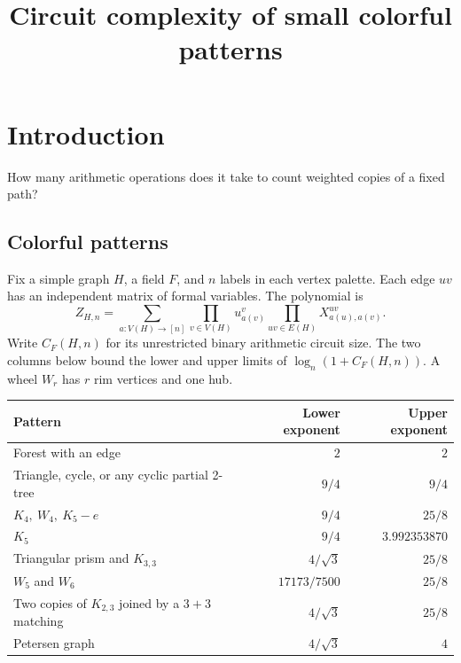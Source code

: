 \documentclass[11pt,letterpaper]{article}
\title{Circuit complexity of small colorful patterns}
\author{}
\begin{document}
\maketitle
\section{Introduction}
How many arithmetic operations does it take to count weighted copies of a fixed path?

\subsection{Colorful patterns}
Fix a simple graph \(H\), a field \(F\), and \(n\) labels in each vertex palette.
Each edge \(uv\) has an independent matrix of formal variables. The polynomial is
\[
 Z_{H,n}=\sum_{a:V(H)\to[n]} \prod_{v\in V(H)} u^v_{a(v)}
                        \prod_{uv\in E(H)} X^{uv}_{a(u),a(v)} .
\]
Write \(C_F(H,n)\) for its unrestricted binary arithmetic circuit size.
The two columns below bound the lower and upper limits of \(\log_n(1+C_F(H,n))\).
A wheel \(W_r\) has \(r\) rim vertices and one hub.

\begin{center}
\begin{tabularx}{\linewidth}{@{}Xrr@{}}
\toprule Pattern & Lower exponent & Upper exponent\\ \midrule
Forest with an edge & \(2\) & \(2\)\\
Triangle, cycle, or any cyclic partial 2-tree & \(9/4\) & \(9/4\)\\
\(K_4,\ W_4,\ K_5-e\) & \(9/4\) & \(25/8\)\\
\(K_5\) & \(9/4\) & \(3.992353870\)\\
Triangular prism and \(K_{3,3}\) & \(4/\sqrt3\) & \(25/8\)\\
\(W_5\) and \(W_6\) & \(17173/7500\) & \(25/8\)\\
Two copies of \(K_{2,3}\) joined by a $3+3$ matching & \(4/\sqrt3\) & \(25/8\)\\
Petersen graph & \(4/\sqrt3\) & \(4\)\\ \bottomrule
\end{tabularx}
\end{center}
\end{document}
